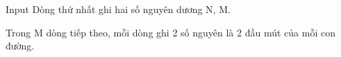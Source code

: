 Input
Dòng thứ nhất ghi hai số nguyên dương N, M.  

   Trong M dòng tiếp theo, mỗi dòng ghi 2 số nguyên là 2 đầu mút của mỗi con đường.